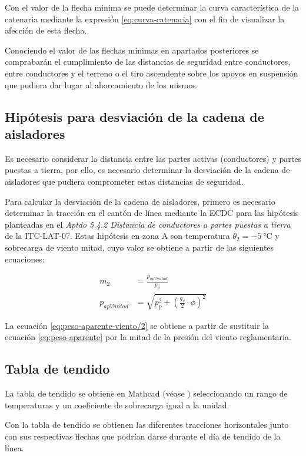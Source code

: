 Con el valor de la flecha mínima se puede determinar la curva característica de la catenaria mediante la expresión \eqref{eq:curva-catenaria} con el fin de visualizar la afección de esta flecha.

Conociendo el valor de las flechas mínimas en apartados posteriores se comprabarán el cumplimiento de las distancias de seguridad entre conductores, entre conductores y el terreno o el tiro ascendente sobre los apoyos en suspensión que pudiera dar lugar al ahorcamiento de los mismos.

\subsection{Hipótesis para desviación de la cadena de aisladores}
\label{subsec:cm-hipotesisAisl}
Es necesario considerar la distancia entre las partes activas (conductores) y partes puestas a tierra, por ello, es necesario determinar la desviación de la cadena de aisladores que pudiera comprometer estas distancias de seguridad.

Para calcular la desviación de la cadena de aisladores, primero es necesario determinar la tracción en el cantón de línea mediante la \ac{ECDC} para las hipótesis planteadas en el \textit{Aptdo 5.4.2 Distancia de conductores a partes puestas a tierra} de la ITC-LAT-07. Estas hipótesis en zona A son temperatura $\theta_2=\SI{-5}{\celsius}$ y sobrecarga de viento mitad, cuyo valor se obtiene a partir de las siguientes ecuaciones:

\begin{align}
    m_2 &= \frac{p_{apVmitad}}{p_p}
    \label{eq:coeficiente-sobrecarga-viento/2}\\[0.5em]
    p_{apVmitad} &= \sqrt{p_p^2 + (\frac{q_v}{2}\cdot\phi)^2}
    \label{eq:peso-aparente-viento/2}
\end{align}

La ecuación \eqref{eq:peso-aparente-viento/2} se obtiene a partir de sustituir la ecuación \eqref{eq:peso-aparente} por la mitad de la presión del viento reglamentaria.

\subsection{Tabla de tendido}
\label{subsec:cm-tendido}
La tabla de tendido se obtiene en Mathcad (véase ) seleccionando un rango de temperaturas y un coeficiente de sobrecarga igual a la unidad.

Con la tabla de tendido se obtienen las diferentes tracciones horizontales junto con sus respectivas flechas que podrían darse durante el día de tendido de la línea.

